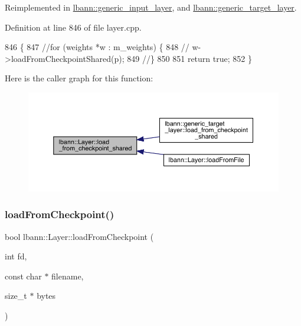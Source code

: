 Reimplemented in \hyperlink{classlbann_1_1generic__input__layer_ae5a542333eaf447a05fc586848e7c94c}{lbann\+::generic\+\_\+input\+\_\+layer}, and \hyperlink{classlbann_1_1generic__target__layer_af7d73f9e77b99b6a8b204cbda512726f}{lbann\+::generic\+\_\+target\+\_\+layer}.



Definition at line 846 of file layer.\+cpp.


\begin{DoxyCode}
846                                                   \{
847   \textcolor{comment}{//for (weights *w : m\_weights) \{}
848   \textcolor{comment}{//  w->loadFromCheckpointShared(p);}
849   \textcolor{comment}{//\}}
850 
851   \textcolor{keywordflow}{return} \textcolor{keyword}{true};
852 \}
\end{DoxyCode}
Here is the caller graph for this function\+:\nopagebreak
\begin{figure}[H]
\begin{center}
\leavevmode
\includegraphics[width=350pt]{classlbann_1_1Layer_a9e262970ecc64166e8b6610e2502ad30_icgraph}
\end{center}
\end{figure}
\mbox{\label{classlbann_1_1Layer_a7ac9335d75d817fc2d5cf171da9b7e22}} 
\subsubsection{\texorpdfstring{load\+From\+Checkpoint()}{loadFromCheckpoint()}}
{\footnotesize\ttfamily bool lbann\+::\+Layer\+::load\+From\+Checkpoint (\begin{DoxyParamCaption}\item[{int}]{fd,  }\item[{const char $\ast$}]{filename,  }\item[{size\+\_\+t $\ast$}]{bytes }\end{DoxyParamCaption})\hspace{0.3cm}{\ttfamily [virtual]}}



